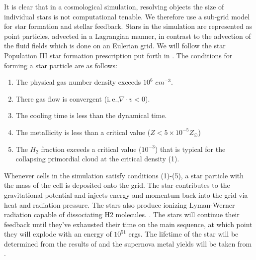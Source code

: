 \documentclass[12pt]{article}
\newcommand*{\ie}{{i.\,e.,}\xspace}
\begin{document}
It is clear that in a cosmological simulation, resolving objects the size of individual stars is not computational tenable. We therefore use a sub-grid model for star formation and stellar feedback. Stars in the simulation are represented as point particles, advected in a Lagrangian manner, in contrast to the advection of the fluid fields which is done on an Eulerian grid. We will follow the star Population III star formation prescription put forth in \cite{Chiaki2019}. The conditions for forming a star particle are as follows:
\begin{enumerate}[(1)]
  \item The physical gas number density exceeds  $10^6$ $cm^{-3}$.
  \item There gas flow is convergent (\ie $\nabla \cdot v < 0$).
  \item The cooling time is less than the dynamical time.
  \item The metallicity is less than a critical value ($Z < 5 \times 10^{-5} Z_{\odot}$)
  \item The $H_2$ fraction exceeds a critical value ($10^{-3}$) that is typical for the collapsing primordial cloud at the critical density (1).
\end{enumerate}

Whenever cells in the simulation satisfy conditions (1)-(5), a star particle with the mass of the cell is deposited onto the grid. The star contributes to the gravitational potential and injects energy and momentum back into the grid via heat and radiation pressure. The stars also produce ionizing Lyman-Werner radiation capable of dissociating H2 molecules. \cite{...}. The stars will continue their feedback until they've exhausted their time on the main sequence, at which point they will explode with an energy of $10^{51}$ ergs. The lifetime of the star will be determined from the results of \cite{Schaerer2002} and the supernova metal yields will be taken from \cite{Nomoto2006}.
\end{document}
